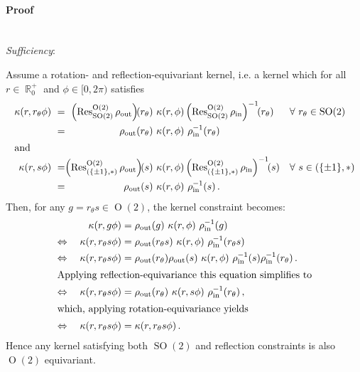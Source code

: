 \documentclass{article}
\newcommand{\lp}{\left(}
\newcommand{\rp}{\right)}
\DeclareMathOperator*{\R}{\mathbb{R}}
\renewcommand{\O}[1]{\ensuremath{\operatorname{O}(#1)}}
\newcommand{\SO}[1]{\ensuremath{\operatorname{SO}(#1)}}
\newcommand{\Flip}{(\{\pm 1\}, *)}
\newcommand{\Res}[2]{\ensuremath{\operatorname{Res}_{#1}^{#2}}}
\begin{document}
\paragraph{Proof}
~\\[2ex]
\textit{Sufficiency}:
\begin{addmargin}[2em]{0em}
	Assume a rotation- and reflection-equivariant kernel, i.e. a kernel which for all $r \in {\R}^+_0$ and $\phi \in [0, 2\pi)$ satisfies
	\begin{align*}
		\kappa(r, r_{\theta} \phi)
		&\ =& \hspace*{-1em}
		     \lp\Res{\SO2}{\O2}\rho_\text{out}\rp\!\!(r_\theta)\ &\kappa(r, \phi)  \lp\Res{\SO2}{\O2}\rho_\text{in}\rp^{-1}\!\!(r_\theta) && \forall\ r_\theta \in \SO{2}\phantom{.} \\
		&\ =& \rho_\text{out}(r_\theta)\                          &\kappa(r, \phi)\ \rho_\text{in}^{-1}(r_\theta) \\
	\intertext{and}
		\kappa(r, s \phi)
		&\ =& \hspace*{-1em}
			\lp\Res{\Flip}{\O2}\rho_\text{out}\rp\!\!(s)\         &\kappa(r, \phi)  \lp\Res{\Flip}{\O2}\rho_\text{in}\rp^{-1}\!\!(s) && \forall\ s \in \Flip \\
		&\ =& \phantom{_\theta}\rho_\text{out}(s)\                &\kappa(r, \phi)\ \rho_\text{in}^{-1}(s) \,.
	\end{align*}
	Then, for any $g=r_{\theta}s \in\O2$, the kernel constraint becomes:
	\begin{align*}
		\kappa(r, g \phi) &= \rho_\text{out}(g)\ \kappa(r, \phi)\ \rho_\text{in}^{-1}(g) \\
		\Leftrightarrow\quad
		\kappa(r, r_\theta s \phi) &= \rho_\text{out}(r_\theta s)\ \kappa(r, \phi)\ \rho_\text{in}^{-1}(r_\theta s) \\
		\Leftrightarrow\quad
		\kappa(r, r_\theta s \phi) &= \rho_\text{out}(r_\theta) \rho_\text{out}(s)\ \kappa(r, \phi)\ \rho_\text{in}^{-1}(s)\rho_\text{in}^{-1}(r_\theta) \,.\\
	\intertext{Applying reflection-equivariance this equation simplifies to}
		\Leftrightarrow\quad
		\kappa(r, r_\theta s \phi) &= \rho_\text{out}(r_\theta)\ \kappa(r, s\phi)\ \rho_\text{in}^{-1}(r_\theta) \,,\\
	\intertext{which, applying rotation-equivariance yields}
		\Leftrightarrow\quad
		\kappa(r, r_\theta s \phi) &= \kappa(r, r_\theta s \phi) \,.
	\end{align*}
	Hence any kernel satisfying both $\SO2$ and reflection constraints is also $\O2$ equivariant.
\end{addmargin}
\end{document}
